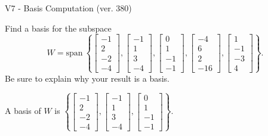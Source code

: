 \begin{exercise}
  \begin{exerciseTitle}V7 - Basis Computation (ver. 380)\end{exerciseTitle}
  \begin{exerciseStatement}
    Find a basis for the subspace 
\[W=\mathrm{span}\ \left\{\left[\begin{array}{r}
-1 \\
2 \\
-2 \\
-4
\end{array}\right] , \left[\begin{array}{r}
-1 \\
1 \\
3 \\
-4
\end{array}\right] , \left[\begin{array}{r}
0 \\
1 \\
-1 \\
-1
\end{array}\right] , \left[\begin{array}{r}
-4 \\
6 \\
2 \\
-16
\end{array}\right] , \left[\begin{array}{r}
1 \\
-1 \\
-3 \\
4
\end{array}\right]\right\}.\]
 Be sure to explain why your result is a basis.


  \end{exerciseStatement}
  \begin{exerciseAnswer}
   A basis of \(W\) is  \(\left\{\left[\begin{array}{r}
-1 \\
2 \\
-2 \\
-4
\end{array}\right] , \left[\begin{array}{r}
-1 \\
1 \\
3 \\
-4
\end{array}\right] , \left[\begin{array}{r}
0 \\
1 \\
-1 \\
-1
\end{array}\right]\right\}\).
  


  \end{exerciseAnswer}
\end{exercise}